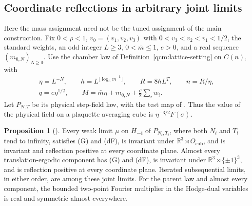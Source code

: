 \documentclass[11pt,letterpaper,reqno]{amsart}
\theoremstyle{definition}
\newtheorem{qcmproposition}{Proposition}[section]
\newenvironment{proposition}[1][]{\pushQED{\qed}\renewcommand{\qedsymbol}{$\blacksquare$}\begin{qcmproposition}[#1]}{\popQED\end{qcmproposition}}
\begin{document}
\subsection{Coordinate reflections in arbitrary joint limits}
\label{qcm:joint-chamber-setting}

Here the mass assignment need not be the tuned assignment of the main
construction. Fix $0<\rho<1$, $v_0=(v_1,v_2,v_3)$ with $0<v_3<v_2<v_1<1/2$, the standard weights,
an odd integer $L\ge3$, $0<\bar m\le1$, $e>0$, and a real sequence
$(m_{0,N})_{N\ge0}$. Use the chamber law of
Definition~\ref{qcm:lattice-setting} on $C(n)$, with
\begin{gather*}
 \eta=L^{-N},\qquad h=L^{\lfloor\log_L\bar m^{-1}\rfloor},\qquad
 R=8hL^T,\qquad n=R/\eta,\\
 q=e\eta^{1/2},\qquad
 M=\bar m\eta+m_{0,N}+\frac{\rho}{2}\sum_iw_i.
\end{gather*}
Let $P_{N,T}$ be its physical step-field law, with the test map of
\cite[Section~6.1]{QEDConstruction}. Thus the value of the physical
field on a plaquette averaging cube is $\eta^{-3/2}F(\sigma)$.

\begin{proposition}\label{qcm:joint-chamber-limits}
Every weak limit $\mu$ on $H_{-4}$ of $P_{N_i,T_i}$, where both
$N_i$ and $T_i$ tend to infinity, satisfies \textup{(G)} and
\textup{(dF)}, is invariant under $\mathbb R^3\rtimes O_{\mathrm{cub}}$,
and is invariant and reflection positive at every coordinate plane.
Almost every translation-ergodic component has \textup{(G)} and
\textup{(dF)}, is invariant under $\mathbb R^3\rtimes\{\pm1\}^3$,
and is reflection positive at every coordinate plane. Iterated
subsequential limits, in either order, are among these joint limits.
For the parent law and almost every component, the bounded
two-point Fourier multiplier in the Hodge-dual variables is real
and symmetric almost everywhere.
\end{proposition}
\end{document}
